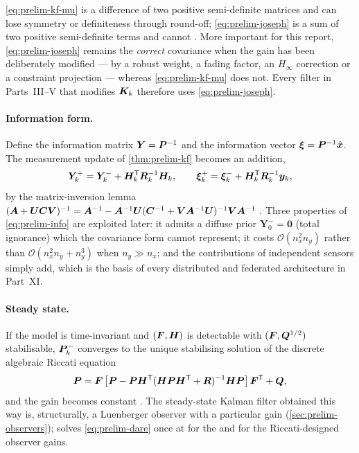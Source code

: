 \begin{remark}\label{rem:prelim-joseph}
\eqref{eq:prelim-kf-mu} is a difference of two positive semi-definite matrices and can lose
symmetry or definiteness through round-off; \eqref{eq:prelim-joseph} is a sum of two positive
semi-definite terms and cannot \cite{bucyjoseph1968,verhaegen1986}. More important for this
report, \eqref{eq:prelim-joseph} remains the \emph{correct} covariance when the gain has been
deliberately modified --- by a robust weight, a fading factor, an $H_\infty$ correction or a
constraint projection --- whereas \eqref{eq:prelim-kf-mu} does not. Every filter in
Parts~III--V that modifies $\bm{K}_k$ therefore uses \eqref{eq:prelim-joseph}.
\end{remark}

\paragraph{Information form.} Define the information matrix $\bm{Y} = \bm{P}^{-1}$ and the
information vector $\bm\xi = \bm{P}^{-1}\hat{\bm{x}}$. The measurement update of
\cref{thm:prelim-kf} becomes an addition,
\begin{equation}
\bm{Y}^+_k = \bm{Y}^-_k + \bm{H}_k^{\mathsf{T}}\bm{R}_k^{-1}\bm{H}_k, \qquad
\bm{\xi}^+_k = \bm{\xi}^-_k + \bm{H}_k^{\mathsf{T}}\bm{R}_k^{-1}\bm{y}_k,
\label{eq:prelim-info}
\end{equation}
by the matrix-inversion lemma
$(\bm{A}+\bm{U}\bm{C}\bm{V})^{-1} = \bm{A}^{-1} - \bm{A}^{-1}\bm{U}(\bm{C}^{-1}+\bm{V}\bm{A}^{-1}\bm{U})^{-1}\bm{V}\bm{A}^{-1}$
\cite{kailath2000}. Three properties of \eqref{eq:prelim-info} are exploited later: it admits a
diffuse prior $\bm{Y}^-_0=\bm 0$ (total ignorance) which the covariance form cannot represent;
it costs $\mathcal{O}(n_x^2 n_y)$ rather than $\mathcal{O}(n_x^2 n_y + n_y^3)$ when
$n_y\gg n_x$; and the contributions of independent sensors simply add, which is the basis of
every distributed and federated architecture in Part~XI.

\paragraph{Steady state.} If the model is time-invariant and $(\bm{F},\bm{H})$ is detectable with
$(\bm{F},\bm{Q}^{1/2})$ stabilisable, $\bm{P}^{-}_k$ converges to the unique stabilising solution of the
discrete algebraic Riccati equation
\begin{equation}
\bm{P} = \bm{F}\left[\bm{P} - \bm{P}\bm{H}^{\mathsf{T}}(\bm{H}\bm{P}\bm{H}^{\mathsf{T}}+\bm{R})^{-1}\bm{H}\bm{P}\right]\bm{F}^{\mathsf{T}} + \bm{Q},
\label{eq:prelim-dare}
\end{equation}
and the gain becomes constant \cite{andersonmoore1979}. The steady-state Kalman filter obtained
this way is, structurally, a Luenberger observer with a particular gain
(\cref{sec:prelim-observers}); \estkit{} solves \eqref{eq:prelim-dare} once at  for
the  and for the Riccati-designed observer gains.

